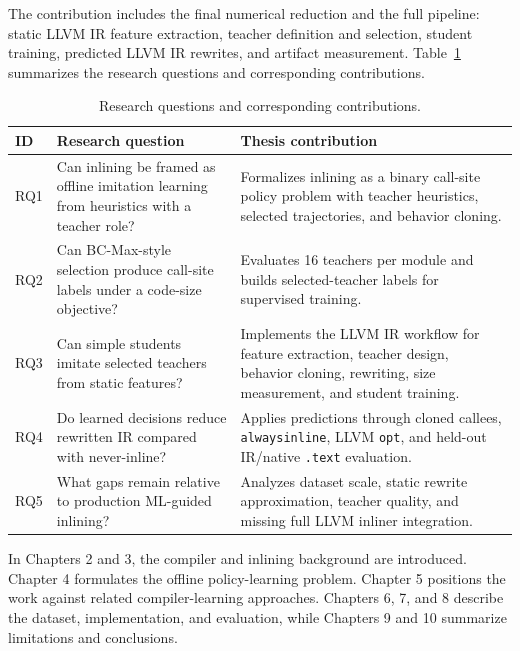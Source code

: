 \documentclass[12pt, a4paper]{report}
\begin{document}
The contribution includes the final numerical reduction and the full pipeline:
static LLVM IR feature extraction, teacher definition and selection, student
training, predicted LLVM IR rewrites, and artifact measurement.
Table~\ref{tab:questions-contributions} summarizes the research questions and
corresponding contributions.

\begin{table}[H]
\centering
{\small
\renewcommand{\arraystretch}{1.0}
\setlength{\tabcolsep}{3pt}
\begin{tabular}{|>{\raggedright\arraybackslash}p{}|
                >{\raggedright\arraybackslash}p{}|
                >{\raggedright\arraybackslash}p{}|}
\hline
ID & Research question & Thesis contribution \\
\hline
RQ1 & Can inlining be framed as offline imitation learning from heuristics with
a teacher role? &
Formalizes inlining as a binary call-site policy problem with teacher
heuristics, selected trajectories, and behavior cloning. \\
\hline
RQ2 & Can BC-Max-style selection produce call-site labels under a code-size
objective? &
Evaluates 16 teachers per module and builds selected-teacher labels for
supervised training. \\
\hline
RQ3 & Can simple students imitate selected teachers from static features? &
Implements the LLVM IR workflow for feature extraction, teacher design,
behavior cloning, rewriting, size measurement, and student training. \\
\hline
RQ4 & Do learned decisions reduce rewritten IR compared with never-inline? &
Applies predictions through cloned callees, \texttt{alwaysinline}, LLVM
\texttt{opt}, and held-out IR/native \texttt{.text} evaluation. \\
\hline
RQ5 & What gaps remain relative to production ML-guided inlining? &
Analyzes dataset scale, static rewrite approximation, teacher quality, and
missing full LLVM inliner integration. \\
\hline
\end{tabular}
}
\caption{Research questions and corresponding contributions.}
\label{tab:questions-contributions}
\end{table}

In Chapters 2 and 3, the compiler and inlining background are introduced.
Chapter 4 formulates the offline policy-learning problem. Chapter 5
positions the work against related compiler-learning approaches. Chapters 6, 7,
and 8 describe the dataset, implementation, and evaluation, while Chapters 9
and 10 summarize limitations and conclusions.
\end{document}
